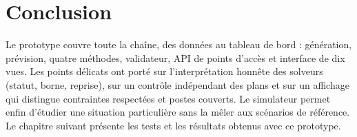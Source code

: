 \section*{Conclusion}
Le prototype couvre toute la chaîne, des données au tableau de bord : génération, prévision, quatre méthodes, validateur, API de \NbEndpoints{} points d'accès et interface de dix vues. Les points délicats ont porté sur l'interprétation honnête des solveurs (statut, borne, reprise), sur un contrôle indépendant des plans et sur un affichage qui distingue contraintes respectées et postes couverts. Le simulateur permet enfin d'étudier une situation particulière sans la mêler aux scénarios de référence. Le chapitre suivant présente les tests et les résultats obtenus avec ce prototype.
